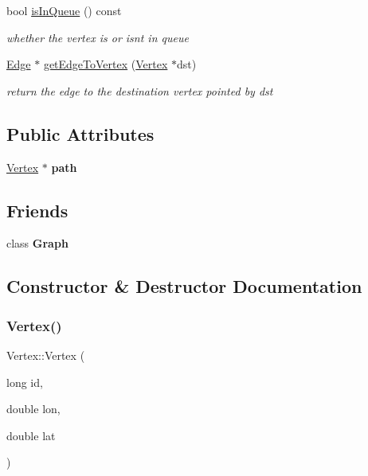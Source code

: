 \begin{DoxyCompactItemize}
bool \hyperlink{class_vertex_aac8bd382faf2f37c38583c0ec1a3801e}{is\+In\+Queue} () const
\begin{DoxyCompactList}\small\item\em whether the vertex is or isn\textquotesingle{}t in queue \end{DoxyCompactList}\item 
\hyperlink{class_edge}{Edge} $\ast$ \hyperlink{class_vertex_a2c25e32570b84328b84a256bed0e6c70}{get\+Edge\+To\+Vertex} (\hyperlink{class_vertex}{Vertex} $\ast$dst)
\begin{DoxyCompactList}\small\item\em return the edge to the destination vertex pointed by dst \end{DoxyCompactList}\end{DoxyCompactItemize}
\subsection*{Public Attributes}
\begin{DoxyCompactItemize}
\item 
\hypertarget{class_vertex_ab6e865ed22eb34fdd50c3df267a8ffe6}{}\label{class_vertex_ab6e865ed22eb34fdd50c3df267a8ffe6} 
\hyperlink{class_vertex}{Vertex} $\ast$ {\bfseries path}
\end{DoxyCompactItemize}
\subsection*{Friends}
\begin{DoxyCompactItemize}
\item 
\hypertarget{class_vertex_afab89afd724f1b07b1aaad6bdc61c47a}{}\label{class_vertex_afab89afd724f1b07b1aaad6bdc61c47a} 
class {\bfseries Graph}
\end{DoxyCompactItemize}


\subsection{Constructor \& Destructor Documentation}
\hypertarget{class_vertex_a86617d6104f1672228e17fd113cb2201}{}\label{class_vertex_a86617d6104f1672228e17fd113cb2201} 
\subsubsection{\texorpdfstring{Vertex()}{Vertex()}}
{\footnotesize\ttfamily Vertex\+::\+Vertex (\begin{DoxyParamCaption}\item[{long}]{id,  }\item[{double}]{lon,  }\item[{double}]{lat }\end{DoxyParamCaption})}



